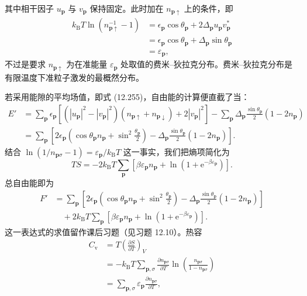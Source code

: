 其中相干因子 $u_{\mathbf{p}}$ 与 $v_{\mathbf{p}}$ 保持固定。此时加在 $n_{\mathbf{p}\uparrow}$ 上的条件，即
\begin{align*}
k_{\mathrm{B}}T\ln\left(n_{\mathbf{p}\uparrow}^{-1}-1\right)&=\epsilon_{\mathbf{p}}\cos\theta_{\mathbf{p}}+2\Delta_{\mathbf{p}}u_{\mathbf{p}}v_{\mathbf{p}}^{*}\\
&=\epsilon_{\mathbf{p}}\cos\theta_{\mathbf{p}}+\Delta_{\mathbf{p}}\sin\theta_{\mathbf{p}}\\
&=\varepsilon_{\mathbf{p}},\tag{12.257}
\end{align*}
不过是要求 $n_{\mathbf{p}\uparrow}$ 为在准能量 $\varepsilon_{\mathbf{p}}$ 处取值的费米–狄拉克分布。费米–狄拉克分布是有限温度下准粒子激发的最概然分布。

若采用能隙的平均场值，即式 (12.255)，自由能的计算便直截了当：
\begin{align*}
E'&=\sum_{\mathbf{p}}\epsilon_{\mathbf{p}}\left[\left(\left|u_{\mathbf{p}}\right|^{2}-\left|v_{\mathbf{p}}\right|^{2}\right)\left(n_{\mathbf{p}\uparrow}+n_{\mathbf{p}\downarrow}\right)+2\left|v_{\mathbf{p}}\right|^{2}\right]-\sum_{\mathbf{p}}\Delta_{\mathbf{p}}\frac{\sin\theta_{\mathbf{p}}}{2}\left(1-2n_{\mathbf{p}}\right)\\
&=\sum_{\mathbf{p}}\left[2\epsilon_{\mathbf{p}}\left(\cos\theta_{\mathbf{p}}n_{\mathbf{p}}+\sin^{2}\frac{\theta_{\mathbf{p}}}{2}\right)-\Delta_{\mathbf{p}}\frac{\sin\theta_{\mathbf{p}}}{2}\left(1-2n_{\mathbf{p}}\right)\right].\tag{12.258}
\end{align*}
结合 $\ln\left(1/n_{\mathbf{p}\sigma}-1\right)=\varepsilon_{\mathbf{p}}/k_{\mathrm{B}}T$ 这一事实，我们把熵项简化为
\begin{equation*}
TS=-2k_{\mathrm{B}}T\sum_{\mathbf{p}}\left[\beta\varepsilon_{\mathbf{p}}n_{\mathbf{p}}+\ln\left(1+\mathrm{e}^{-\beta\varepsilon_{\mathbf{p}}}\right)\right].\tag{12.259}
\end{equation*}
总自由能即为
\begin{align*}
F'&=\sum_{\mathbf{p}}\left[2\epsilon_{\mathbf{p}}\left(\cos\theta_{\mathbf{p}}n_{\mathbf{p}}+\sin^{2}\frac{\theta_{\mathbf{p}}}{2}\right)-\Delta_{\mathbf{p}}\frac{\sin\theta_{\mathbf{p}}}{2}\left(1-2n_{\mathbf{p}}\right)\right]\\
&\quad+2k_{\mathrm{B}}T\sum_{\mathbf{p}}\left[\beta\varepsilon_{\mathbf{p}}n_{\mathbf{p}}+\ln\left(1+\mathrm{e}^{-\beta\varepsilon_{\mathbf{p}}}\right)\right].\tag{12.260}
\end{align*}
这一表达式的求值留作课后习题（见习题 12.10）。热容
\begin{align*}
C_{\mathrm{v}}&=T\left(\frac{\partial S}{\partial T}\right)_{V}\\
&=-k_{\mathrm{B}}T\sum_{\mathbf{p},\sigma}\frac{\partial n_{\mathbf{p}\sigma}}{\partial T}\ln\left(\frac{n_{\mathbf{p}\sigma}}{1-n_{\mathbf{p}\sigma}}\right)\\
&=\sum_{\mathbf{p},\sigma}\varepsilon_{\mathbf{p}}\frac{\partial n_{\mathbf{p}\sigma}}{\partial T},\tag{12.261}
\end{align*}
